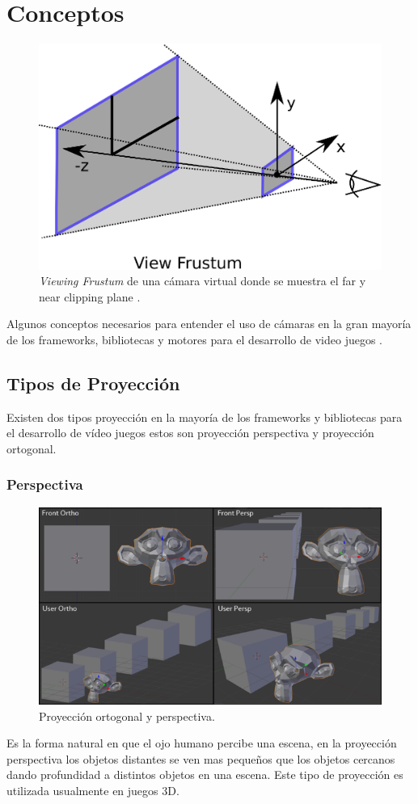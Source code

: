 \section{Conceptos}
\begin{figure}
\includegraphics[width=\linewidth]{media/frustum.eps}
\caption{\emph{Viewing Frustum} de una cámara virtual donde se muestra el far y near clipping plane \cite{microsoft_frustum}.}
\label{fig:frustum}
\end{figure}
Algunos conceptos necesarios para entender el uso de cámaras en la gran mayoría de los frameworks, bibliotecas y motores para el desarrollo de video juegos \cite{unity_camera}.
\subsection{Tipos de Proyección}
Existen dos tipos proyección en la mayoría de los frameworks y bibliotecas para el desarrollo de vídeo juegos estos son proyección perspectiva y proyección ortogonal.
\subsubsection{Perspectiva}
\setlength\intextsep{0pt}
\begin{figure}
\includegraphics[width=\linewidth]{media/projections.png}
\caption{Proyección ortogonal y perspectiva.}
\end{figure}
Es la forma natural en que el ojo humano percibe una escena, en la proyección perspectiva los objetos distantes se ven mas pequeños que los objetos cercanos dando profundidad a distintos objetos en una escena. Este tipo de proyección es utilizada usualmente en juegos 3D.
